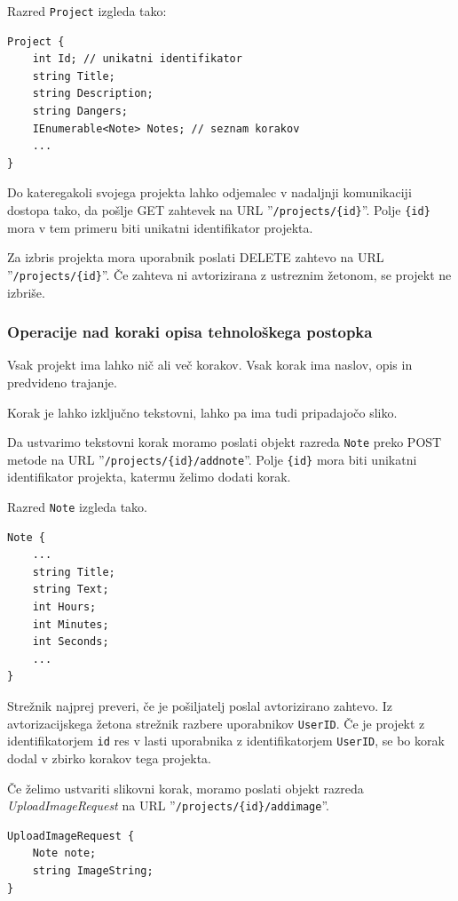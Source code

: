 \documentclass[a4paper, 12pt]{book}
\begin{document}
\noindent Razred \texttt{Project} izgleda tako:

\begin{verbatim}
Project { 
    int Id; // unikatni identifikator 
    string Title; 
    string Description; 
    string Dangers; 
    IEnumerable<Note> Notes; // seznam korakov 
    ... 
}
\end{verbatim}
Do kateregakoli svojega projekta lahko odjemalec v nadaljnji komunikaciji dostopa tako, da pošlje GET zahtevek na URL ''\texttt{/projects/\{id\}}''.
Polje \texttt{\{id\}} mora v tem primeru biti unikatni identifikator projekta.

Za izbris projekta mora uporabnik poslati DELETE zahtevo na URL ''\texttt{/projects/\{id\}}''.
Če zahteva ni avtorizirana z ustreznim žetonom, se projekt ne izbriše.

\subsubsection{Operacije nad koraki opisa tehnološkega postopka}

Vsak projekt ima lahko nič ali več korakov.
Vsak korak ima naslov, opis in predvideno trajanje.

Korak je lahko izključno tekstovni, lahko pa ima tudi pripadajočo sliko.

Da ustvarimo tekstovni korak moramo poslati objekt razreda \texttt{Note} preko POST metode na URL ''\texttt{/projects/\{id\}/addnote}''.
Polje \texttt{\{id\}} mora biti unikatni identifikator projekta, katermu želimo dodati korak.

\noindent Razred \texttt{Note} izgleda tako.

\begin{verbatim}
Note { 
    ... 
    string Title; 
    string Text; 
    int Hours; 
    int Minutes;
    int Seconds;
    ...
}
\end{verbatim}

Strežnik najprej preveri, če je pošiljatelj poslal avtorizirano zahtevo.
Iz avtorizacijskega žetona strežnik razbere uporabnikov \texttt{UserID}. 
Če je projekt z identifikatorjem \texttt{id} res v lasti uporabnika z identifikatorjem \texttt{UserID}, se bo korak dodal v zbirko korakov tega projekta.

Če želimo ustvariti slikovni korak, moramo poslati objekt razreda \textit{UploadImageRequest} na URL ''\texttt{/projects/\{id\}/addimage}''.

\begin{verbatim}
UploadImageRequest { 
    Note note; 
    string ImageString; 
}
\end{verbatim}
\end{document}
